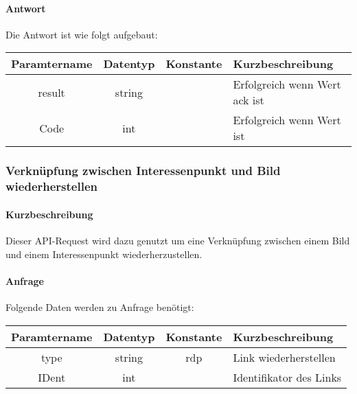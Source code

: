 \paragraph{Antwort}Die Antwort ist wie folgt aufgebaut:
\begin{table}[H]
	\begin{tabular}{|c|c|c|p{6.5cm}|}
		\hline
		\textbf{Paramtername} & \textbf{Datentyp} & \textbf{Konstante} & \textbf{Kurzbeschreibung}                                                                                               \\ \hline
		result              & string           &                 & Erfolgreich wenn Wert {\glqq ack\grqq} ist \\ \hline
		Code                & int              &                 & Erfolgreich wenn Wert {\glqq 0\grqq} ist \\ \hline
	\end{tabular}
\end{table}
\subsubsection{Verknüpfung zwischen Interessenpunkt und Bild wiederherstellen}
\paragraph{Kurzbeschreibung}Dieser API-Request wird dazu genutzt um eine Verknüpfung zwischen einem Bild und einem Interessenpunkt wiederherzustellen.
\paragraph{Anfrage}Folgende Daten werden zu Anfrage benötigt:
\begin{table}[H]
	\begin{tabular}{|c|c|c|p{6.5cm}|}
		\hline
		\textbf{Paramtername} & \textbf{Datentyp} & \textbf{Konstante} & \textbf{Kurzbeschreibung}                                                                                               \\ \hline
		type                & string            & rdp                & Link wiederherstellen \\ \hline
		IDent               & int               &                    & Identifikator des Links \\ \hline
	\end{tabular}
\end{table}
